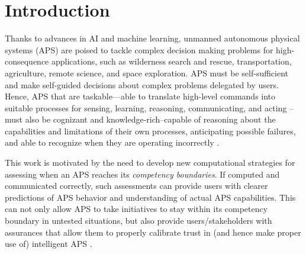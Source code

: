 \section{Introduction}

Thanks to advances in AI and machine learning, unmanned autonomous physical systems (APS) are poised to tackle complex decision making problems for high-consequence applications, such as wilderness search and rescue, transportation, agriculture, remote science, and space exploration. 
APS must be self-sufficient and make self-guided decisions about complex problems delegated by users. Hence, APS that are taskable---able to translate high-level commands into suitable processes for sensing, learning, reasoning, communicating, and acting --must also be cognizant and knowledge-rich--capable of reasoning about the capabilities and limitations of their own processes, anticipating possible failures, and able to recognize when they are operating incorrectly \cite{david2016defense}. %

This work is motivated by the need to develop new computational strategies for assessing when an APS reaches its \emph{competency boundaries}. If computed and communicated correctly, such assessments can provide users with clearer predictions of APS behavior and understanding of actual APS capabilities. This can not only allow APS to take initiatives to stay within its competency boundary in untested situations, but also provide users/stakeholders with assurances that allow them to properly calibrate trust in (and hence make proper use of) intelligent APS \cite{Israelsen2017-ym}. 

